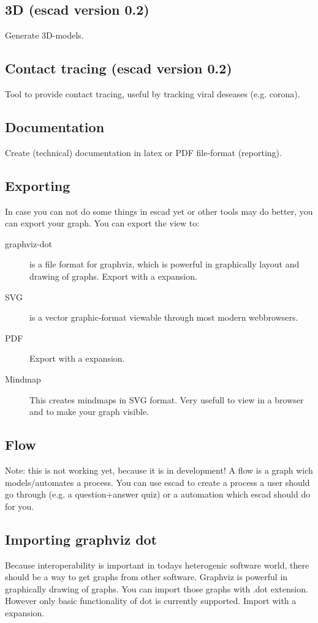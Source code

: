 \documentclass[a4paper, 12pt, openany]{scrbook}
\begin{document}
\subsection{3D (escad version 0.2)}
Generate 3D-models.
\subsection{Contact tracing (escad version 0.2)}
Tool to provide contact tracing, useful by tracking viral deseases (e.g. corona).
\subsection{Documentation}
Create (technical) documentation in latex or PDF file-format (reporting).
\subsection{Exporting}
In case you can not do some things in escad yet or other tools may do better, you can export your graph. You can export the view to:
\begin{description}
\item[graphviz-dot] is a file format for graphviz, which is powerful in graphically layout and drawing of graphs. Export with a expansion.
\item[SVG] is a vector graphic-format viewable through most modern webbrowsers.
\item[PDF] Export with a expansion.
\item[Mindmap] This creates mindmaps in SVG format. Very usefull to view in a browser and to make your graph visible.
\end{description}
\subsection{Flow}
Note: this is not working yet, because it is in development!
A flow is a graph wich models/automates a process. You can use escad to create a process a user should go through (e.g. a question+answer quiz) or a automation which escad should do for you.
\subsection{Importing graphviz dot}
Because interoperability is important in todays heterogenic software world, there should be a way to get graphs from other software.
Graphviz is powerful in graphically drawing of graphs. You can import those graphs with .dot extension. However only basic functionality of dot is currently supported. Import with a expansion.
\end{document}
